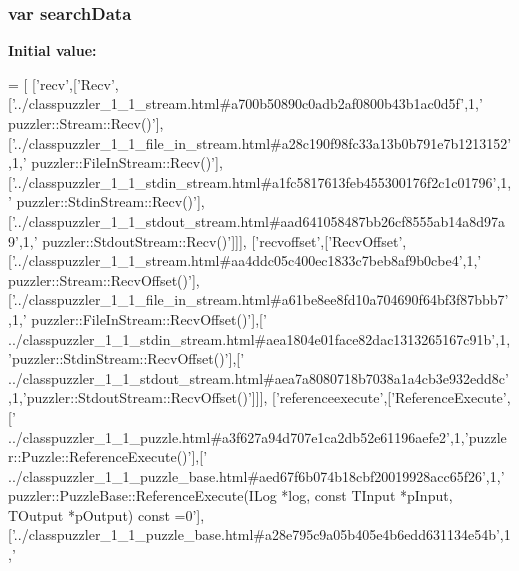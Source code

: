 \subsubsection[{search\+Data}]{\setlength{\rightskip}{0pt plus 5cm}var search\+Data}\label{a00093_ad01a7523f103d6242ef9b0451861231e}
{\bfseries Initial value\+:}
\begin{DoxyCode}
=
[
  [\textcolor{stringliteral}{'recv'},[\textcolor{stringliteral}{'Recv'},[\textcolor{stringliteral}{'../classpuzzler\_1\_1\_stream.html#a700b50890c0adb2af0800b43b1ac0d5f'},1,\textcolor{stringliteral}{'
      puzzler::Stream::Recv()'}],[\textcolor{stringliteral}{'../classpuzzler\_1\_1\_file\_in\_stream.html#a28c190f98fc33a13b0b791e7b1213152'},1,\textcolor{stringliteral}{'
      puzzler::FileInStream::Recv()'}],[\textcolor{stringliteral}{'../classpuzzler\_1\_1\_stdin\_stream.html#a1fc5817613feb455300176f2c1c01796'},1,\textcolor{stringliteral}{'
      puzzler::StdinStream::Recv()'}],[\textcolor{stringliteral}{'../classpuzzler\_1\_1\_stdout\_stream.html#aad641058487bb26cf8555ab14a8d97a9'},1,\textcolor{stringliteral}{'
      puzzler::StdoutStream::Recv()'}]]],
  [\textcolor{stringliteral}{'recvoffset'},[\textcolor{stringliteral}{'RecvOffset'},[\textcolor{stringliteral}{'../classpuzzler\_1\_1\_stream.html#aa4ddc05c400ec1833c7beb8af9b0cbe4'},1,\textcolor{stringliteral}{'
      puzzler::Stream::RecvOffset()'}],[\textcolor{stringliteral}{'../classpuzzler\_1\_1\_file\_in\_stream.html#a61be8ee8fd10a704690f64bf3f87bbb7'},1,\textcolor{stringliteral}{'
      puzzler::FileInStream::RecvOffset()'}],[\textcolor{stringliteral}{'
      ../classpuzzler\_1\_1\_stdin\_stream.html#aea1804e01face82dac1313265167c91b'},1,\textcolor{stringliteral}{'puzzler::StdinStream::RecvOffset()'}],[\textcolor{stringliteral}{'
      ../classpuzzler\_1\_1\_stdout\_stream.html#aea7a8080718b7038a1a4cb3e932edd8c'},1,\textcolor{stringliteral}{'puzzler::StdoutStream::RecvOffset()'}]]],
  [\textcolor{stringliteral}{'referenceexecute'},[\textcolor{stringliteral}{'ReferenceExecute'},[\textcolor{stringliteral}{'
      ../classpuzzler\_1\_1\_puzzle.html#a3f627a94d707e1ca2db52e61196aefe2'},1,\textcolor{stringliteral}{'puzzler::Puzzle::ReferenceExecute()'}],[\textcolor{stringliteral}{'
      ../classpuzzler\_1\_1\_puzzle\_base.html#aed67f6b074b18cbf20019928acc65f26'},1,\textcolor{stringliteral}{'puzzler::PuzzleBase::ReferenceExecute(ILog *log, const TInput *pInput, TOutput *pOutput) const
       =0'}],[\textcolor{stringliteral}{'../classpuzzler\_1\_1\_puzzle\_base.html#a28e795c9a05b405e4b6edd631134e54b'},1,\textcolor{stringliteral}{'
}
\end{DoxyCode}
